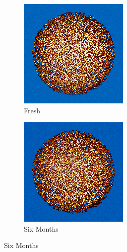 \begin{figure}[H]
\centering
%
\begin{subfigure}{0.4\textwidth}
  \includegraphics[width=0.95\linewidth]{figures/burn-20-bstep0}
  \caption{Fresh}
  \label{fig:bstep0}
\end{subfigure}%
%
\begin{subfigure}{0.4\textwidth}
  \includegraphics[width=0.95\linewidth]{figures/burn-20-bstep1}
  \caption{Six Months}
  \label{fig:bstep1}
\end{subfigure}%


\end{figure}
